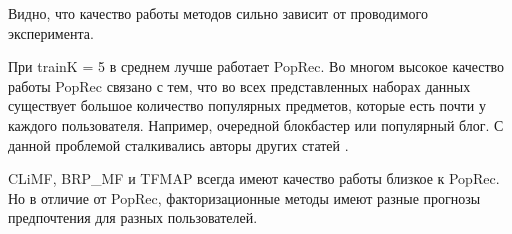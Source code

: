 \documentclass[a4paper,12pt]{article}
\begin{document}
\begin{table}[H]
\caption{Набор данных MobieLens 1m}
\label{tab:movm}
\end{table} 

Видно, что качество работы методов сильно зависит от проводимого эксперимента. 

При trainK = 5 в среднем лучше работает PopRec. Во многом высокое качество работы PopRec связано с тем, что во всех представленных наборах данных существует большое количество популярных предметов, которые есть почти у каждого пользователя. Например, очередной блокбастер или  популярный блог. С данной проблемой сталкивались авторы других статей \cite{climf, reasonbadwork}.
 
 CLiMF, BRP\_MF и TFMAP всегда имеют качество работы близкое к PopRec. Но в отличие от PopRec, факторизационные методы имеют разные прогнозы предпочтения для разных пользователей.  
 
\end{document}
